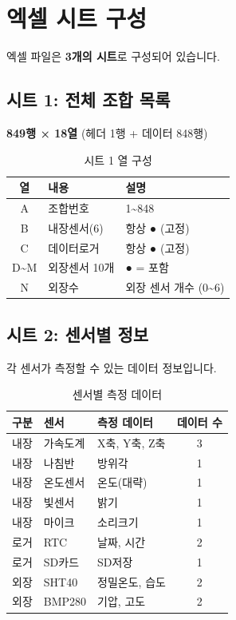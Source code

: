\documentclass[11pt,a4paper]{article}
\begin{document}
\section{엑셀 시트 구성}

엑셀 파일은 \textbf{3개의 시트}로 구성되어 있습니다.

\subsection{시트 1: 전체 조합 목록}

\textbf{849행 × 18열} (헤더 1행 + 데이터 848행)

\begin{table}[H]
\centering
\begin{tabular}{|c|l|l|}
\hline
\rowcolor{tableheader}
\textbf{열} & \textbf{내용} & \textbf{설명} \\
\hline
A & 조합번호 & 1\textasciitilde 848 \\
\hline
B & 내장센서(6) & 항상 ● (고정) \\
\hline
C & 데이터로거 & 항상 ● (고정) \\
\hline
D\textasciitilde M & 외장센서 10개 & ● = 포함 \\
\hline
N & 외장수 & 외장 센서 개수 (0\textasciitilde 6) \\
\hline
\end{tabular}
\caption{시트 1 열 구성}
\end{table}

\subsection{시트 2: 센서별 정보}

각 센서가 측정할 수 있는 데이터 정보입니다.

\begin{table}[H]
\centering
\begin{tabular}{|c|l|l|c|}
\hline
\rowcolor{tableheader}
\textbf{구분} & \textbf{센서} & \textbf{측정 데이터} & \textbf{데이터 수} \\
\hline
\cellcolor{greenbox} 내장 & 가속도계 & X축, Y축, Z축 & 3 \\
\hline
\cellcolor{greenbox} 내장 & 나침반 & 방위각 & 1 \\
\hline
\cellcolor{greenbox} 내장 & 온도센서 & 온도(대략) & 1 \\
\hline
\cellcolor{greenbox} 내장 & 빛센서 & 밝기 & 1 \\
\hline
\cellcolor{greenbox} 내장 & 마이크 & 소리크기 & 1 \\
\hline
\cellcolor{orangebox} 로거 & RTC & 날짜, 시간 & 2 \\
\hline
\cellcolor{orangebox} 로거 & SD카드 & SD저장 & 1 \\
\hline
\cellcolor{bluebox} 외장 & SHT40 & 정밀온도, 습도 & 2 \\
\hline
\cellcolor{bluebox} 외장 & BMP280 & 기압, 고도 & 2 \\
\hline
\end{tabular}
\caption{센서별 측정 데이터}
\end{table}
\end{document}
